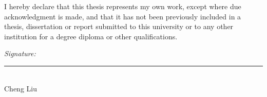 




I hereby declare that this thesis represents my own work, except where due acknowledgment is made, and that it has not been previously included in a thesis, dissertation or report submitted to this university or to any other institution for a degree diploma or other qualifications.

\vspace{20mm}

\begin{flushright}
\textit{Signature: }\rule{5cm}{0.5pt}\\
Cheng Liu \qquad\qquad\qquad\qquad
\end{flushright}




